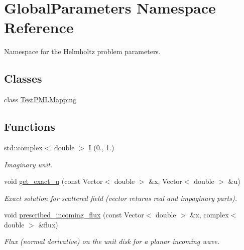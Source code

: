 \hypertarget{namespaceGlobalParameters}{}\section{Global\+Parameters Namespace Reference}
\label{namespaceGlobalParameters}


Namespace for the Helmholtz problem parameters.  


\subsection*{Classes}
\begin{DoxyCompactItemize}
\item 
class \hyperlink{classGlobalParameters_1_1TestPMLMapping}{Test\+P\+M\+L\+Mapping}
\end{DoxyCompactItemize}
\subsection*{Functions}
\begin{DoxyCompactItemize}
\item 
std\+::complex$<$ double $>$ \hyperlink{namespaceGlobalParameters_a558ef64d34b43c794ef29491cb4840ea}{I} (0., 1.)
\begin{DoxyCompactList}\small\item\em Imaginary unit. \end{DoxyCompactList}\item 
void \hyperlink{namespaceGlobalParameters_ae2320da6053f5527b2af5ebb362a8a07}{get\+\_\+exact\+\_\+u} (const Vector$<$ double $>$ \&x, Vector$<$ double $>$ \&u)
\begin{DoxyCompactList}\small\item\em Exact solution for scattered field (vector returns real and impaginary parts). \end{DoxyCompactList}\item 
void \hyperlink{namespaceGlobalParameters_a5183de63b992338ee60bb4da78a45039}{prescribed\+\_\+incoming\+\_\+flux} (const Vector$<$ double $>$ \&x, complex$<$ double $>$ \&flux)
\begin{DoxyCompactList}\small\item\em Flux (normal derivative) on the unit disk for a planar incoming wave. \end{DoxyCompactList}\end{DoxyCompactItemize}
